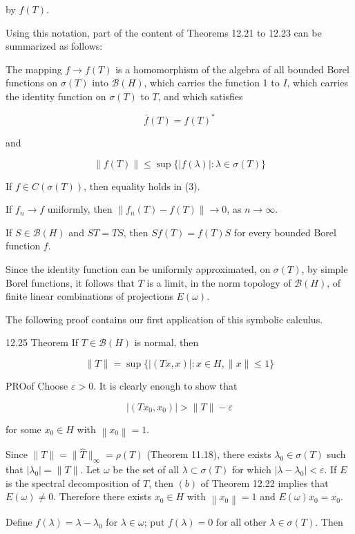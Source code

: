 \documentclass[10pt]{article}
\begin{document}
by $f(T)$.

Using this notation, part of the content of Theorems 12.21 to 12.23 can be summarized as follows:

The mapping $f \rightarrow f(T)$ is a homomorphism of the algebra of all bounded Borel functions on $\sigma(T)$ into $\mathscr{B}(H)$, which carries the function 1 to $I$, which carries the identity function on $\sigma(T)$ to $T$, and which satisfies

$$
\bar{f}(T)=f(T)^{*}
$$

and

$$
\|f(T)\| \leq \sup \{|f(\lambda)|: \lambda \in \sigma(T)\}
$$

If $f \in C(\sigma(T))$, then equality holds in (3).

If $f_{n} \rightarrow f$ uniformly, then $\left\|f_{n}(T)-f(T)\right\| \rightarrow 0$, as $n \rightarrow \infty$.

If $S \in \mathscr{B}(H)$ and $S T=T S$, then $S f(T)=f(T) S$ for every bounded Borel function $f$.

Since the identity function can be uniformly approximated, on $\sigma(T)$, by simple Borel functions, it follows that $T$ is a limit, in the norm topology of $\mathscr{B}(H)$, of finite linear combinations of projections $E(\omega)$.

The following proof contains our first application of this symbolic calculus.

12.25 Theorem If $T \in \mathscr{B}(H)$ is normal, then

$$
\|T\|=\sup \{|(T x, x)|: x \in H,\|x\| \leq 1\}
$$

PROof Choose $\varepsilon>0$. It is clearly enough to show that

$$
\left|\left(T x_{0}, x_{0}\right)\right|>\|T\|-\varepsilon
$$

for some $x_{0} \in H$ with $\left\|x_{0}\right\|=1$.

Since $\|T\|=\|\hat{T}\|_{\infty}=\rho(T)$ (Theorem 11.18), there exists $\lambda_{0} \in \sigma(T)$ such that $\left|\lambda_{0}\right|=\|T\|$. Let $\omega$ be the set of all $\lambda \subset \sigma(T)$ for which $\left|\lambda-\lambda_{0}\right|<\varepsilon$. If $E$ is the spectral decomposition of $T$, then $(b)$ of Theorem 12.22 implies that $E(\omega) \neq 0$. Therefore there exists $x_{0} \in H$ with $\left\|x_{0}\right\|=1$ and $E(\omega) x_{0}=x_{0}$.

Define $f(\lambda)=\lambda-\lambda_{0}$ for $\lambda \in \omega$; put $f(\lambda)=0$ for all other $\lambda \in \sigma(T)$. Then
\end{document}
